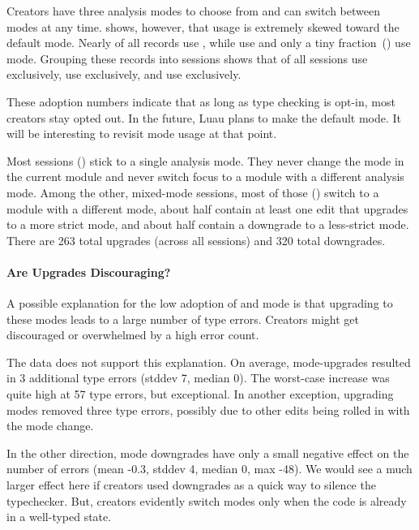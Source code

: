 \documentclass[english,submission,cleveref]{programming}
\begin{document}
Creators have three analysis modes to choose from
and can switch between modes at any time.
 shows, however, that
usage is extremely skewed toward the default \mnocheck{} mode.
Nearly  of all records use \mnocheck{}, while  use
\mnonstrict{} and only a tiny fraction~() use \mstrict{} mode.
Grouping these records into sessions shows that
 of all sessions use \mnocheck{} exclusively,
 use \mnonstrict{} exclusively,
and  use \mstrict{} exclusively.

These adoption numbers indicate that as long as type checking is opt-in, most
creators stay opted out.
In the future, Luau plans to make \mnonstrict{} the default mode.
It will be interesting to revisit mode usage at that point.

Most sessions () stick to a single analysis mode.
They never change the mode in the current module and never
switch focus to a module with a different analysis mode.
Among the other, mixed-mode sessions, most of those () switch to a
module with a different mode, about half contain at least one edit that
upgrades to a more strict mode, and about half contain a downgrade to a
less-strict mode.
There are 263 total upgrades (across all sessions) and 320 total downgrades.


\paragraph{Are Upgrades Discouraging?}


A possible explanation for the low adoption of \mnonstrict{} and
\mstrict{} mode is that upgrading to these modes leads to a large
number of type errors.
Creators might get discouraged or overwhelmed by a high error count.

The data does not support this explanation.
On average, mode-upgrades resulted in 3 additional
type errors (stddev 7, median 0).
The worst-case increase was quite high at 57 type errors, but exceptional.
In another exception, upgrading modes removed three type errors,
possibly due to other edits being rolled in with the
mode change.

In the other direction, mode downgrades have only a small negative effect on the
number of errors (mean -0.3, stddev 4, median 0, max -48).
We would see a much larger effect here if creators used downgrades
as a quick way to silence the typechecker.
But, creators evidently switch modes only when the code is already
in a well-typed state.
\end{document}
